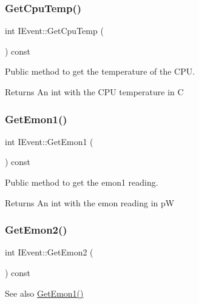 \subsubsection{\texorpdfstring{Get\+Cpu\+Temp()}{GetCpuTemp()}}
{\footnotesize\ttfamily int I\+Event\+::\+Get\+Cpu\+Temp (\begin{DoxyParamCaption}{ }\end{DoxyParamCaption}) const}



Public method to get the temperature of the C\+PU. 

\begin{DoxyReturn}{Returns}
An int with the C\+PU temperature in C 
\end{DoxyReturn}
\mbox{\label{classIEvent_a4d95eb0bd935bc7089bdf13be6cfb35d}} 
\subsubsection{\texorpdfstring{Get\+Emon1()}{GetEmon1()}}
{\footnotesize\ttfamily int I\+Event\+::\+Get\+Emon1 (\begin{DoxyParamCaption}{ }\end{DoxyParamCaption}) const}



Public method to get the emon1 reading. 

\begin{DoxyReturn}{Returns}
An int with the emon reading in pW 
\end{DoxyReturn}
\mbox{\label{classIEvent_a7733e88f4e08eee6073a448d6b75723b}} 
\subsubsection{\texorpdfstring{Get\+Emon2()}{GetEmon2()}}
{\footnotesize\ttfamily int I\+Event\+::\+Get\+Emon2 (\begin{DoxyParamCaption}{ }\end{DoxyParamCaption}) const}

\begin{DoxySeeAlso}{See also}
\hyperlink{classIEvent_a4d95eb0bd935bc7089bdf13be6cfb35d}{Get\+Emon1()} 
\end{DoxySeeAlso}
\mbox{\label{classIEvent_a7ba773316eefbd7190f5b1ac16206b63}} 
